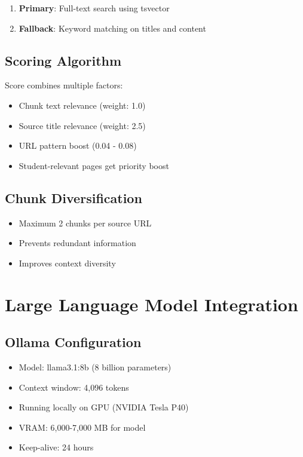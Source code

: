 \documentclass[12pt]{article}
\begin{document}
\begin{enumerate}
    \item \textbf{Primary}: Full-text search using tsvector
    \item \textbf{Fallback}: Keyword matching on titles and content
\end{enumerate}

\subsection{Scoring Algorithm}

Score combines multiple factors:
\begin{itemize}
    \item Chunk text relevance (weight: 1.0)
    \item Source title relevance (weight: 2.5)
    \item URL pattern boost (0.04 - 0.08)
    \item Student-relevant pages get priority boost
\end{itemize}

\subsection{Chunk Diversification}

\begin{itemize}
    \item Maximum 2 chunks per source URL
    \item Prevents redundant information
    \item Improves context diversity
\end{itemize}

\section{Large Language Model Integration}

\subsection{Ollama Configuration}

\begin{itemize}
    \item Model: llama3.1:8b (8 billion parameters)
    \item Context window: 4,096 tokens
    \item Running locally on GPU (NVIDIA Tesla P40)
    \item VRAM: 6,000-7,000 MB for model
    \item Keep-alive: 24 hours
\end{itemize}
\end{document}
